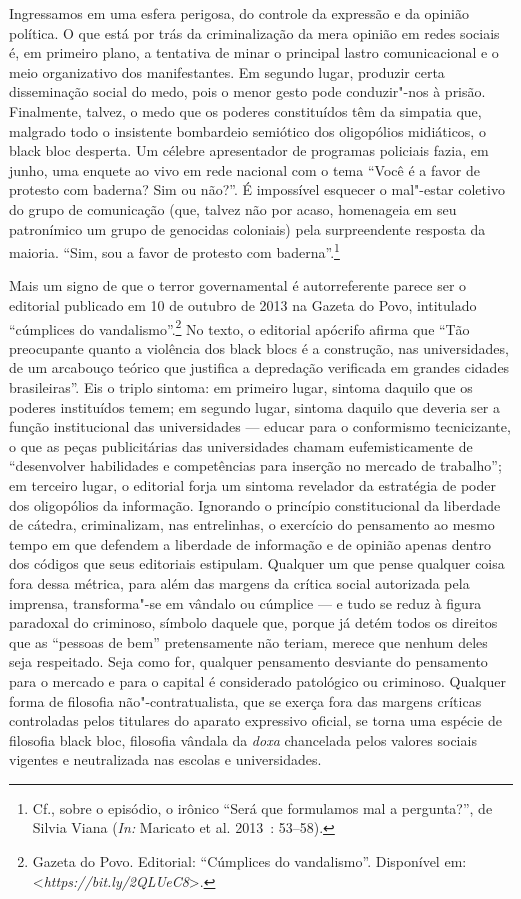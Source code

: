 Ingressamos em uma esfera perigosa, do controle da expressão e da
opinião política. O que está por trás da criminalização da mera opinião
em redes sociais é, em primeiro plano, a tentativa de minar o principal
lastro comunicacional e o meio organizativo dos manifestantes. Em
segundo lugar, produzir certa disseminação social do medo, pois o menor
gesto pode conduzir"-nos à prisão. Finalmente, talvez, o medo que os
poderes constituídos têm da simpatia que, malgrado todo o insistente
bombardeio semiótico dos oligopólios midiáticos, o black bloc desperta.
Um célebre apresentador de programas policiais fazia, em junho, uma
enquete ao vivo em rede nacional com o tema ``Você é a favor de protesto
com baderna? Sim ou não?''. É impossível esquecer o mal"-estar coletivo
do grupo de comunicação (que, talvez não por acaso, homenageia em seu
patronímico um grupo de genocidas coloniais) pela surpreendente resposta
da maioria. ``Sim, sou a favor de protesto com
baderna''.\footnote{Cf., sobre o episódio, o irônico
  ``Será que formulamos mal a pergunta?'', de Silvia Viana (\emph{In:}
  Maricato et al. 2013~: 53--58).}

Mais um signo de que o terror governamental é autorreferente parece ser
o editorial publicado em 10 de outubro de 2013 na Gazeta do Povo,
intitulado ``cúmplices do vandalismo''.\footnote{Gazeta
  do Povo. Editorial: ``Cúmplices do vandalismo''. Disponível em:
  \textless{}\emph{https://bit.ly/2QLUeC8}\textgreater{}.}
No texto, o editorial apócrifo afirma que ``Tão preocupante quanto a
violência dos black blocs é a construção, nas universidades, de um
arcabouço teórico que justifica a depredação verificada em grandes
cidades brasileiras''. Eis o triplo sintoma: em primeiro lugar, sintoma
daquilo que os poderes instituídos temem; em segundo lugar, sintoma
daquilo que deveria ser a função institucional das universidades ---
educar para o conformismo tecnicizante, o que as peças publicitárias das
universidades chamam eufemisticamente de ``desenvolver habilidades e
competências para inserção no mercado de trabalho''; em terceiro lugar,
o editorial forja um sintoma revelador da estratégia de poder dos
oligopólios da informação. Ignorando o princípio constitucional da
liberdade de cátedra, criminalizam, nas entrelinhas, o exercício do
pensamento ao mesmo tempo em que defendem a liberdade de informação e de
opinião apenas dentro dos códigos que seus editoriais estipulam.
Qualquer um que pense qualquer coisa fora dessa métrica, para além das
margens da crítica social autorizada pela imprensa, transforma"-se em
vândalo ou cúmplice --- e tudo se reduz à figura paradoxal do criminoso,
símbolo daquele que, porque já detém todos os direitos que as ``pessoas
de bem'' pretensamente não teriam, merece que nenhum deles seja
respeitado. Seja como for, qualquer pensamento desviante do pensamento
para o mercado e para o capital é considerado patológico ou criminoso.
Qualquer forma de filosofia não"-contratualista, que se exerça fora das
margens críticas controladas pelos titulares do aparato expressivo
oficial, se torna uma espécie de filosofia black bloc, filosofia
vândala da \emph{doxa }chancelada pelos valores sociais vigentes e
neutralizada nas escolas e universidades.

